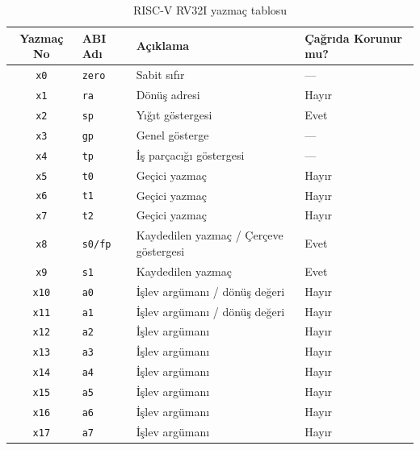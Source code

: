 \begin{table}[H]
\centering
\caption{RISC-V RV32I yazmaç tablosu}\label{tab:ekc-yazmaclar}
{\small
\begin{tabular}{@{}clll@{}}
\toprule
\textbf{Yazmaç No} & \textbf{ABI Adı} & \textbf{Açıklama} & \textbf{Çağrıda Korunur mu?} \\
\midrule
\texttt{x0}  & \texttt{zero}   & Sabit sıfır\index{zero yazmacı}              & --- \\
\texttt{x1}  & \texttt{ra}     & Dönüş adresi\index{dönüş adresi}             & Hayır \\
\texttt{x2}  & \texttt{sp}     & Yığıt göstergesi\index{yığıt göstergesi}     & Evet \\
\texttt{x3}  & \texttt{gp}     & Genel gösterge\index{genel gösterge}          & --- \\
\texttt{x4}  & \texttt{tp}     & İş parçacığı göstergesi                      & --- \\
\midrule
\texttt{x5}  & \texttt{t0}     & Geçici yazmaç\index{geçici yazmaç}           & Hayır \\
\texttt{x6}  & \texttt{t1}     & Geçici yazmaç                                & Hayır \\
\texttt{x7}  & \texttt{t2}     & Geçici yazmaç                                & Hayır \\
\midrule
\texttt{x8}  & \texttt{s0/fp}  & Kaydedilen yazmaç / Çerçeve göstergesi\index{çerçeve göstergesi} & Evet \\
\texttt{x9}  & \texttt{s1}     & Kaydedilen yazmaç\index{kaydedilen yazmaç}   & Evet \\
\midrule
\texttt{x10} & \texttt{a0}     & İşlev argümanı / dönüş değeri                & Hayır \\
\texttt{x11} & \texttt{a1}     & İşlev argümanı / dönüş değeri                & Hayır \\
\texttt{x12} & \texttt{a2}     & İşlev argümanı                               & Hayır \\
\texttt{x13} & \texttt{a3}     & İşlev argümanı                               & Hayır \\
\texttt{x14} & \texttt{a4}     & İşlev argümanı                               & Hayır \\
\texttt{x15} & \texttt{a5}     & İşlev argümanı                               & Hayır \\
\texttt{x16} & \texttt{a6}     & İşlev argümanı                               & Hayır \\
\texttt{x17} & \texttt{a7}     & İşlev argümanı                               & Hayır \\

\end{tabular}}
\end{table}
